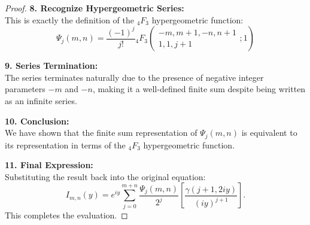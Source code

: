 \documentclass[12pt]{article}
\begin{document}
\begin{proof}
\textbf{8. Recognize Hypergeometric Series:}\\[1mm]
This is exactly the definition of the  \( {}_4F_3 \) hypergeometric function:
\[
\Psi_j(m,n) = \frac{(-1)^j}{j!} {}_4F_3\left(
\begin{matrix}
-m, m+1, -n, n+1 \\
1, 1, j+1
\end{matrix}; 1 \right)
\]

\textbf{9. Series Termination:}\\[1mm]
The series terminates naturally due to the presence of negative integer parameters \( -m \) and \( -n \), making it a well-defined finite sum despite being written as an infinite series.

\textbf{10. Conclusion:}\\[1mm]
We have shown that the finite sum representation of \(\Psi_j(m, n)\) is equivalent to its representation in terms of the  \( {}_4F_3 \) hypergeometric function.

\textbf{11. Final Expression:}\\[1mm]
Substituting the result back into the original equation:
\[
I_{m,n}(y)=e^{iy}\sum_{j=0}^{m+n}\frac{\Psi_j(m,n)}{2^j}\left[\frac{\gamma(j+1,2iy)}{(iy)^{j+1}}\right].
\]
This completes the evaluation.
\end{proof}
\end{document}
